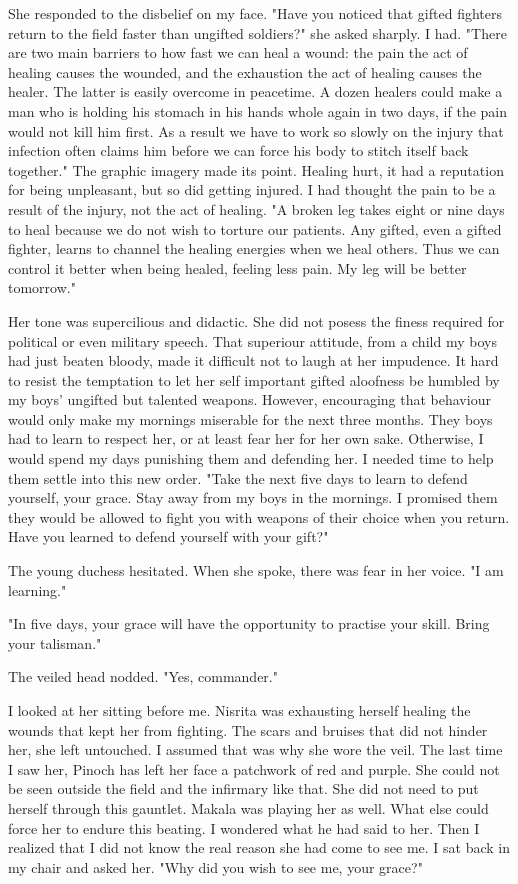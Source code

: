 \documentclass{article}
\begin{document}
She responded to the disbelief on my face. "Have you noticed that gifted fighters return to the field faster than ungifted soldiers?" she asked sharply. I had. "There are two main barriers to how fast we can heal a wound: the pain the act of healing causes the wounded, and the exhaustion the act of healing causes the healer. The latter is easily overcome in peacetime. A dozen healers could make a man who is holding his stomach in his hands whole again in two days, if the pain would not kill him first. As a result we have to work so slowly on the injury that infection often claims him before we can force his body to stitch itself back together." The graphic imagery made its point. Healing hurt, it had a reputation for being unpleasant, but so did getting injured. I had thought the pain to be a result of the injury, not the act of healing. "A broken leg takes eight or nine days to heal because we do not wish to torture our patients. Any gifted, even a gifted fighter, learns to channel the healing energies when we heal others. Thus we can control it better when being healed, feeling less pain. My leg will be better tomorrow."

Her tone was supercilious and didactic. She did not posess the finess required for political or even military speech. That superiour attitude, from a child my boys had just beaten bloody, made it difficult not to laugh at her impudence. It  hard to resist the temptation to let her self important gifted aloofness be humbled by my boys' ungifted but talented weapons. However, encouraging that behaviour would only make my mornings miserable for the next three months. They boys had to learn to respect her, or at least fear her for her own sake. Otherwise, I would spend my days punishing them and defending her. I needed time to help them settle into this new order. "Take the next five days to learn to defend yourself, your grace. Stay away from my boys in the mornings. I promised them they would be allowed to fight you with weapons of their choice when you return. Have you learned to defend yourself with your gift?"

The young duchess hesitated. When she spoke, there was fear in her voice. "I am learning."

"In five days, your grace will have the opportunity to practise your skill. Bring your talisman."

The veiled head nodded. "Yes, commander."

I looked at her sitting before me. Nisrita was exhausting herself healing the wounds that kept her from fighting. The scars and bruises that did not hinder her, she left untouched. I assumed that was why she wore the veil. The last time I saw her, Pinoch has left her face a patchwork of red and purple. She could not be seen outside the field and the infirmary like that. She did not need to put herself through this gauntlet. Makala was playing her as well. What else could force her to endure this beating. I wondered what he had said to her. Then I realized that I did not know the real reason she had come to see me. I sat back in my chair and asked her. "Why did you wish to see me, your grace?"
\end{document}
